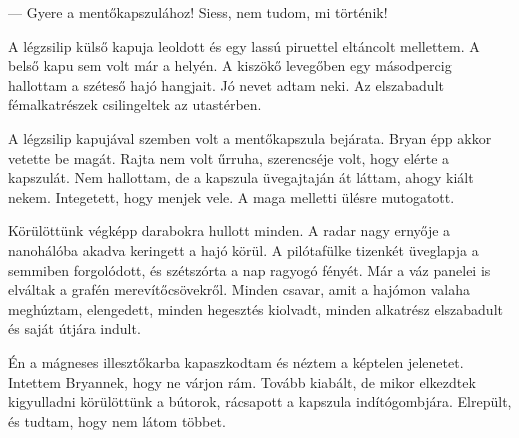 \documentclass[10pt]{memoir}
\begin{document}
--- Gyere a mentőkapszulához! Siess, nem tudom, mi történik!

A légzsilip külső kapuja leoldott és egy lassú piruettel eltáncolt mellettem. A
belső kapu sem volt már a helyén. A kiszökő levegőben egy másodpercig hallottam
a széteső hajó hangjait. Jó nevet adtam neki. Az elszabadult fémalkatrészek
csilingeltek az utastérben.

A légzsilip kapujával szemben volt a mentőkapszula bejárata. Bryan épp akkor
vetette be magát. Rajta nem volt űrruha, szerencséje volt, hogy elérte a
kapszulát. Nem hallottam, de a kapszula üvegajtaján át láttam, ahogy kiált
nekem. Integetett, hogy menjek vele. A maga melletti ülésre mutogatott.

Körülöttünk végképp darabokra hullott minden. A radar nagy ernyője a nanohálóba
akadva keringett a hajó körül. A pilótafülke tizenkét üveglapja a semmiben
forgolódott, és szétszórta a nap ragyogó fényét. Már a váz panelei is elváltak
a grafén merevítőcsövekről. Minden csavar, amit a hajómon valaha meghúztam,
elengedett, minden hegesztés kiolvadt, minden alkatrész elszabadult és saját
útjára indult.

Én a mágneses illesztőkarba kapaszkodtam és néztem a képtelen jelenetet.
Intettem Bryannek, hogy ne várjon rám. Tovább kiabált, de mikor elkezdtek
kigyulladni körülöttünk a bútorok, rácsapott a kapszula indítógombjára.
Elrepült, és tudtam, hogy nem látom többet.
\end{document}
